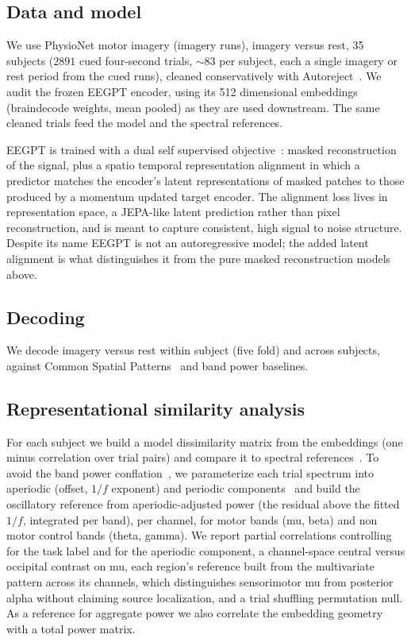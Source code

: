 \documentclass[journal]{IEEEtran}
\begin{document}
\subsection{Data and model}
We use PhysioNet motor imagery (imagery runs), imagery versus rest, 35 subjects
($2891$ cued four-second trials, ${\sim}83$ per subject, each a single imagery or
rest period from the cued runs), cleaned conservatively with
Autoreject~\cite{jas2017autoreject}. We audit the frozen EEGPT encoder, using
its 512 dimensional embeddings (braindecode weights, mean pooled) as they are
used downstream. The same cleaned trials feed the model and the spectral
references.

EEGPT is trained with a dual self supervised
objective~\cite{wang2024eegpt}: masked reconstruction of the signal, plus a
spatio temporal representation alignment in which a predictor matches the
encoder's latent representations of masked patches to those produced by a
momentum updated target encoder. The alignment loss lives in representation
space, a JEPA-like latent prediction rather than pixel reconstruction, and is
meant to capture consistent, high signal to noise structure. Despite its name
EEGPT is not an autoregressive model; the added latent alignment is what
distinguishes it from the pure masked reconstruction models above.

\subsection{Decoding}
We decode imagery versus rest within subject (five fold) and across subjects,
against Common Spatial Patterns~\cite{blankertz2008csp} and band power
baselines.

\subsection{Representational similarity analysis}
For each subject we build a model dissimilarity matrix from the embeddings (one
minus correlation over trial pairs) and compare it to spectral
references~\cite{kriegeskorte2008rsa}. To avoid the band power
conflation~\cite{donoghue2020bandratio}, we parameterize each trial spectrum
into aperiodic (offset, $1/f$ exponent) and periodic
components~\cite{donoghue2020specparam,gerster2022separating} and build the
oscillatory reference from aperiodic-adjusted power (the residual above the
fitted $1/f$, integrated per band), per channel, for motor bands (mu, beta) and
non motor control bands (theta, gamma). We report partial correlations
controlling for the task label and for the aperiodic component, a channel-space
central versus occipital contrast on mu, each region's reference built from the
multivariate pattern across its channels, which distinguishes sensorimotor mu
from posterior alpha without claiming source localization, and a trial shuffling
permutation null. As a reference for aggregate power we also correlate the
embedding geometry with a total power matrix.
\end{document}
